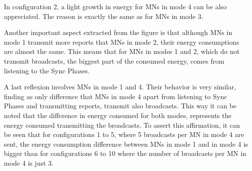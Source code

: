 In configuration 2, a light growth in energy for \acp{MN} in mode 4 can be also appreciated. The reason is exactly the same as for \acp{MN} in mode 3.

Another important aspect extracted from the figure is that although \acp{MN} in mode 1 transmit more reports that \acp{MN} in mode 2, their energy
consumptions are almost the same. This means that for \acp{MN} in modes 1 and 2, which do not transmit broadcasts, the biggest part of the consumed energy,
comes from listening to the Sync Phases.

A last reflexion involves \acp{MN} in mode 1 and 4. Their behavior is very similar, finding as only difference that \acp{MN} in mode 4 apart from 
listening to Sync Phases and transmitting reports, transmit also broadcasts. This way it can be noted that the difference in energy consumed for both
modes, represents the energy consumed transmitting the broadcasts. To assert this affirmation, it can be seen that for configurations 1 to 5, where
5 broadcasts per \ac{MN} in mode 4 are sent, the energy consumption difference between \acp{MN} in mode 1 and in mode 4 is bigger than for configurations
6 to 10 where the number of broadcasts per \ac{MN} in mode 4 is just 3.

